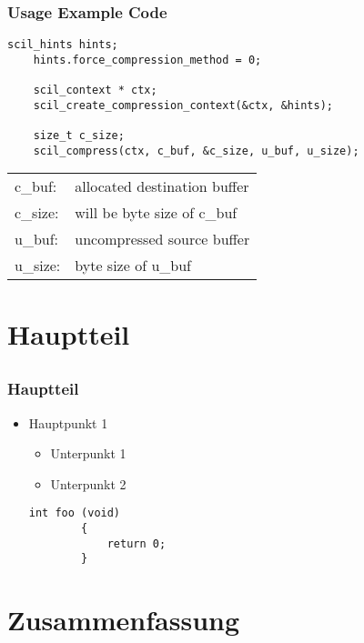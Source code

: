 \documentclass[compress]{beamer}
\begin{document}
\begin{frame}[fragile]
	\frametitle{Usage Example Code}

	\begin{lstlisting}[caption=SCIL usage example]
	scil_hints hints;
	hints.force_compression_method = 0;

	scil_context * ctx;
	scil_create_compression_context(&ctx, &hints);

	size_t c_size;
	scil_compress(ctx, c_buf, &c_size, u_buf, u_size);
	\end{lstlisting}

	\bigskip

	\begin{tabular}{ll}
		c\_buf: & allocated destination buffer \\
		c\_size: & will be byte size of c\_buf \\
		u\_buf: & uncompressed source buffer \\
		u\_size: & byte size of u\_buf
	\end{tabular}

\end{frame}

\section{Hauptteil}
\subsection*{}

\begin{frame}[fragile]
	\frametitle{Hauptteil}

	\begin{itemize}
		\item Hauptpunkt 1
		\begin{itemize}
			\item Unterpunkt 1
			\item Unterpunkt 2
		\end{itemize}

		\begin{lstlisting}[caption=Beispielquelltext]
		int foo (void)
		{
		    return 0;
		}
		\end{lstlisting}
	\end{itemize}
\end{frame}

\section{Zusammenfassung}
\end{document}
